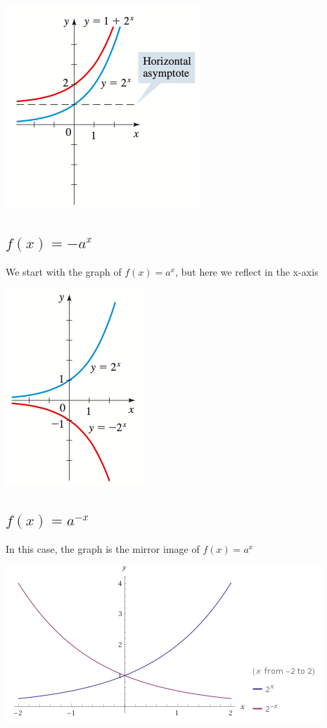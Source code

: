 \documentclass{book}
\begin{document}
	 \includegraphics[scale=0.8]{exp1}
	 
	 \subsection{$f(x) = -a^x$}
	 We start with the graph of $f(x) = a^x$, but here we reflect in the x-axis
	 
	 \includegraphics[scale=0.8]{exp2}
	 
	 \subsection{$f(x) = a^{-x}$}
	 In this case, the graph is the mirror image of $f(x) = a^x$
	 
	 \includegraphics[scale=0.8]{exp3}
	 
\end{document}
